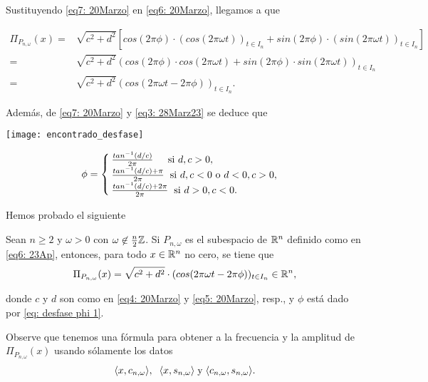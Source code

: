 \noindent 
Sustituyendo \eqref{eq7: 20Marzo} en \eqref{eq6: 20Marzo},
llegamos a que

\begin{align*}
\Pi_{P_{n, \omega}}(x) = & 
\sqrt{c^{2}+d^{2}} \left[
cos(2 \pi \phi) \cdot (cos (2 \pi \omega t))_{t \in I_{n}} +
sin(2 \pi \phi) \cdot (sin (2 \pi \omega t))_{t \in I_{n}} 
\right] \\
= & 
\sqrt{c^{2}+d^{2}} 
(cos(2 \pi \phi) \cdot cos (2 \pi \omega t) +
sin(2 \pi \phi) \cdot sin (2 \pi \omega t) )_{t \in I_{n}} \\
= & 
\sqrt{c^{2}+d^{2}} 
(cos(2 \pi \omega t - 2 \pi \phi))_{t \in I_{n}}.
\end{align*}

\noindent
Además, de \eqref{eq7: 20Marzo} y \eqref{eq3: 28Marz23}
se deduce que
\begin{marginfigure}
\texttt{[image: encontrado\_desfase]} 
\end{marginfigure}
\begin{equation}
\label{eq: desfase phi 1}
\phi =
\begin{cases}
\frac{tan^{-1}(d/c) }{2 \pi}  \hspace{0.4cm}    \text{   si }   d, c > 0,  \\
\frac{tan^{-1}(d/c) + \pi }{2 \pi} \hspace{0.2cm}  \text{si }  d, c < 0
\text{ o } d<0, c>0, \\
\frac{tan^{-1}(d/c) + 2\pi }{2 \pi} \hspace{0.2cm}  \text{si }  d>0,  c < 0. 
\end{cases}
\end{equation}


Hemos probado el siguiente
\begin{teo}
\label{teo: amelie1}
Sean $n \geq 2$ y $\omega > 0$ con $\omega \not\in \frac{n}{2}\mathbb{Z}$.
Si $P_{n, \omega}$ es el subespacio de $\mathbb{R}^{n}$ definido como 
en \eqref{eq6: 23Ap}, entonces, para todo 
$x \in \mathbb{R}^{n}$ no cero, se tiene que
\begin{equation}
\label{ec: desfase explicito 1}
\Pi_{P_{n, \omega}} (x) = \sqrt{c^{2}+d^{2}} \cdot (
cos (2 \pi \omega t - 2 \pi \phi)
)_{t \in I_{n}} \in \mathbb{R}^{n},
\end{equation}

\noindent
donde 
$c$ y $d$ son como en \eqref{eq4: 20Marzo} y 
\eqref{eq5: 20Marzo}, resp., y $\phi$ está 
dado por \eqref{eq: desfase phi 1}.
\end{teo}
Observe que tenemos una fórmula para obtener a
la frecuencia y la amplitud de $\Pi_{P_{n, \omega}}(x)$
usando sólamente los datos
\[
\langle x, c_{n, \omega} \rangle, \hspace{0.2cm}
\langle x, s_{n, \omega} \rangle \hspace{0.1cm} \text{y} \hspace{0.1cm}
\langle c_{n, \omega}, s_{n, \omega} \rangle.
\]

